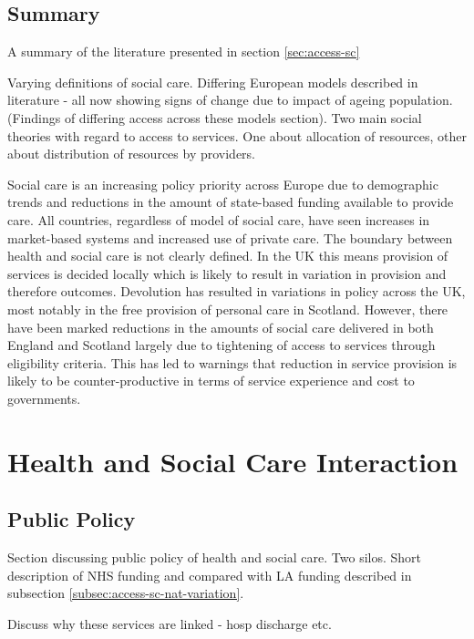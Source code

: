 \documentclass[12pt,]{report}
\begin{document}
\subsection{Summary}\label{subsec:access-sc-summary}

A summary of the literature presented in section \ref{sec:access-sc}

Varying definitions of social care. Differing European models described
in literature - all now showing signs of change due to impact of ageing
population. (Findings of differing access across these models section).
Two main social theories with regard to access to services. One about
allocation of resources, other about distribution of resources by
providers.

Social care is an increasing policy priority across Europe due to
demographic trends and reductions in the amount of state-based funding
available to provide care. All countries, regardless of model of social
care, have seen increases in market-based systems and increased use of
private care. The boundary between health and social care is not clearly
defined. In the UK this means provision of services is decided locally
which is likely to result in variation in provision and therefore
outcomes. Devolution has resulted in variations in policy across the UK,
most notably in the free provision of personal care in Scotland.
However, there have been marked reductions in the amounts of social care
delivered in both England and Scotland largely due to tightening of
access to services through eligibility criteria. This has led to
warnings that reduction in service provision is likely to be
counter-productive in terms of service experience and cost to
governments.

\section{Health and Social Care Interaction}\label{sec:hsc-interaction}

\subsection{Public Policy}\label{subsec:policy}

Section discussing public policy of health and social care. Two silos.
Short description of NHS funding and compared with LA funding described
in subsection \ref{subsec:access-sc-nat-variation}.

Discuss why these services are linked - hosp discharge etc.
\end{document}
